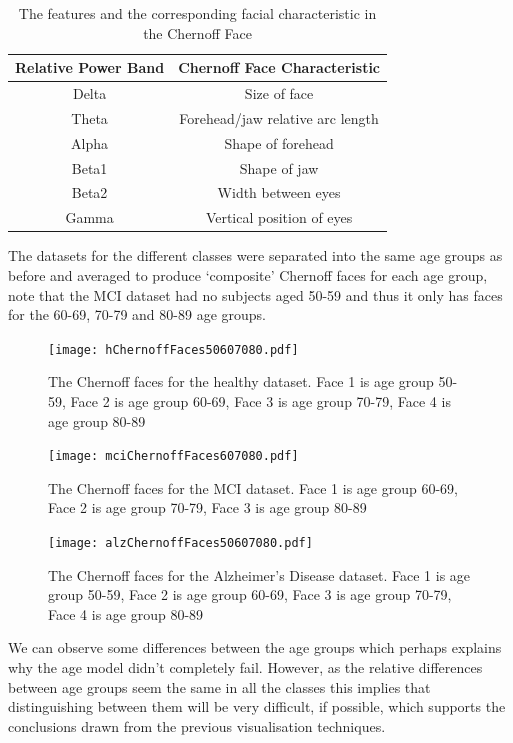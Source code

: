 \begin{table}[h!]
\begin{center}
\begin{tabular}[h!]{|c|c|}
\hline
Relative Power Band & Chernoff Face Characteristic \\
\hline
Delta & Size of face \\
\hline
Theta & Forehead/jaw relative arc length \\
\hline
Alpha & Shape of forehead\\
\hline
Beta1 & Shape of jaw\\
\hline
Beta2 & Width between eyes\\
\hline
Gamma & Vertical position of eyes\\
\hline
\end{tabular}
\caption{The features and the corresponding facial characteristic in the Chernoff Face}
\label{tab:chernoff}
\end{center}
\end{table}

The datasets for the different classes were separated into the same age groups as before and averaged to produce `composite' Chernoff faces for each age group, note that the MCI dataset had no subjects aged 50-59 and thus it only has faces for the 60-69, 70-79 and 80-89 age groups.


\begin{figure}[h]
  \centering
    \texttt{[image: hChernoffFaces50607080.pdf]}
    \caption{The Chernoff faces for the healthy dataset. Face 1 is age group 50-59, Face 2 is age group 60-69, Face 3 is age group 70-79, Face 4 is age group 80-89}
    \label{fig:hchernoff}
\end{figure}

\begin{figure}[h]
  \centering
    \texttt{[image: mciChernoffFaces607080.pdf]}
    \caption{The Chernoff faces for the MCI dataset. Face 1 is age group 60-69, Face 2 is age group 70-79, Face 3 is age group 80-89}
    \label{fig:mcichernoff}
\end{figure}

\begin{figure}[h]
  \centering
    \texttt{[image: alzChernoffFaces50607080.pdf]}
    \caption{The Chernoff faces for the Alzheimer's Disease dataset. Face 1 is age group 50-59, Face 2 is age group 60-69, Face 3 is age group 70-79, Face 4 is age group 80-89}
    \label{fig:alzchernoff}
\end{figure}

We can observe some differences between the age groups which perhaps explains why the age model didn't completely fail. However, as the relative differences between age groups seem the same in all the classes this implies that distinguishing between them will be very difficult, if possible, which supports the conclusions drawn from the previous visualisation techniques.



